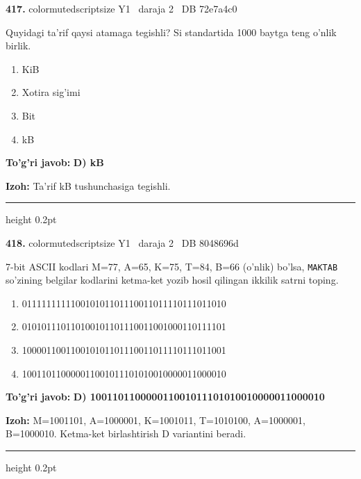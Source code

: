 \documentclass[10pt,a4paper,oneside]{article}
\begin{document}
\noindent\textbf{\color{ink}417.}  {color{muted}scriptsize Y1 \textbullet\ daraja 2 \textbullet\ DB 72e7a4c0}
\par
Quyidagi ta'rif qaysi atamaga tegishli? Si standartida 1000 baytga teng o'nlik birlik.
\begin{enumerate}[label=\Alph*),leftmargin=9mm]
\item KiB
\item Xotira sig'imi
\item Bit
\item kB
\end{enumerate}
\begin{tcolorbox}[enhanced,breakable,colback=teal!4,colframe=teal!50!black,boxrule=0.5pt,arc=1.1mm,left=3mm,right=3mm,top=1.7mm,bottom=1.7mm,before skip=2mm,after skip=2mm]
\textbf{\color{teal}To'g'ri javob:} \textbf{D) kB}
\par\smallskip
\textbf{Izoh:} Ta'rif kB tushunchasiga tegishli.
\end{tcolorbox}
\vspace{2mm}\hrule height 0.2pt \vspace{3mm}

\noindent\textbf{\color{ink}418.}  {color{muted}scriptsize Y1 \textbullet\ daraja 2 \textbullet\ DB 8048696d}
\par
7-bit ASCII kodlari M=77, A=65, K=75, T=84, B=66 (o'nlik) bo'lsa, \texttt{MAKTAB} so'zining belgilar kodlarini ketma-ket yozib hosil qilingan ikkilik satrni toping.
\begin{enumerate}[label=\Alph*),leftmargin=9mm]
\item 011111111110010101101110011011110111011010
\item 010101110110100101101110011001000110111101
\item 100001100110010101101110011011110111011001
\item 100110110000011001011101010010000011000010
\end{enumerate}
\begin{tcolorbox}[enhanced,breakable,colback=teal!4,colframe=teal!50!black,boxrule=0.5pt,arc=1.1mm,left=3mm,right=3mm,top=1.7mm,bottom=1.7mm,before skip=2mm,after skip=2mm]
\textbf{\color{teal}To'g'ri javob:} \textbf{D) 100110110000011001011101010010000011000010}
\par\smallskip
\textbf{Izoh:} M=1001101, A=1000001, K=1001011, T=1010100, A=1000001, B=1000010. Ketma-ket birlashtirish D variantini beradi.
\end{tcolorbox}
\vspace{2mm}\hrule height 0.2pt \vspace{3mm}
\end{document}
